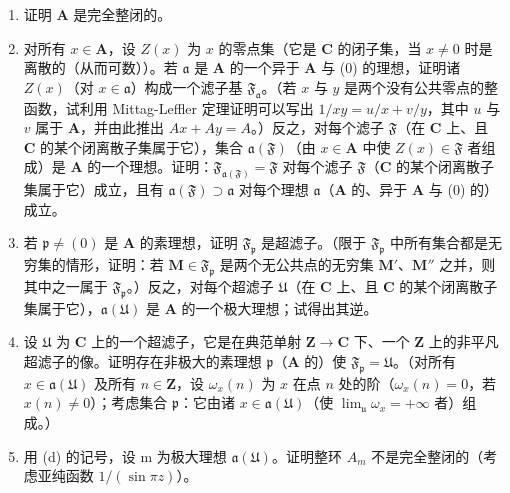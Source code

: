 \begin{enumerate}
\def\labelenumi{(\alph{enumi})}
\item
  证明 \(\mathbf{A}\) 是完全整闭的。
\item
  对所有 \(x \in \mathbf{A}\)，设 \(Z(x)\) 为 \(x\) 的零点集（它是 \(\mathbf{C}\) 的闭子集，当 \(x \neq 0\) 时是离散的（从而可数））。若 \(\mathfrak{a}\) 是 \(\mathbf{A}\) 的一个异于 \(\mathbf{A}\) 与 (0) 的理想，证明诸 \(Z(x)\)（对 \(x \in \mathfrak{a}\)）构成一个滤子基 \(\mathfrak{F}_{\mathfrak{a}}\)。（若 \(x\) 与 \(y\) 是两个没有公共零点的整函数，试利用 Mittag-Leffler 定理证明可以写出 \(1 / xy = u / x + v / y\)，其中 \(u\) 与 \(v\) 属于 \(\mathbf{A}\)，并由此推出 \(Ax + Ay = A\)。）反之，对每个滤子 \(\mathfrak{F}\)（在 \(\mathbf{C}\) 上、且 \(\mathbf{C}\) 的某个闭离散子集属于它），集合 \(\mathfrak{a}(\mathfrak{F})\)（由 \(x \in \mathbf{A}\) 中使 \(Z(x) \in \mathfrak{F}\) 者组成）是 \(\mathbf{A}\) 的一个理想。证明：\(\mathfrak{F}_{\mathfrak{a}(\mathfrak{F})} = \mathfrak{F}\) 对每个滤子 \(\mathfrak{F}\)（\(\mathbf{C}\) 的某个闭离散子集属于它）成立，且有 \(\mathfrak{a}(\mathfrak{F}) \supset \mathfrak{a}\) 对每个理想 \(\mathfrak{a}\)（\(\mathbf{A}\) 的、异于 \(\mathbf{A}\) 与 (0) 的）成立。
\item
  若 \(\mathfrak{p} \neq (0)\) 是 \(\mathbf{A}\) 的素理想，证明 \(\mathfrak{F}_{\mathfrak{p}}\) 是超滤子。（限于 \(\mathfrak{F}_{\mathfrak{p}}\) 中所有集合都是无穷集的情形，证明：若 \(\mathbf{M} \in \mathfrak{F}_{\mathfrak{p}}\) 是两个无公共点的无穷集 \(\mathbf{M}'\)、\(\mathbf{M}''\) 之并，则其中之一属于 \(\mathfrak{F}_{\mathfrak{p}}\)。）反之，对每个超滤子 \(\mathfrak{U}\)（在 \(\mathbf{C}\) 上、且 \(\mathbf{C}\) 的某个闭离散子集属于它），\(\mathfrak{a}(\mathfrak{U})\) 是 \(\mathbf{A}\) 的一个极大理想；试得出其逆。
\item
  设 \(\mathfrak{U}\) 为 \(\mathbf{C}\) 上的一个超滤子，它是在典范单射 \(\mathbf{Z} \to \mathbf{C}\) 下、一个 \(\mathbf{Z}\) 上的非平凡超滤子的像。证明存在非极大的素理想 \(\mathfrak{p}\)（\(\mathbf{A}\) 的）使 \(\mathfrak{F}_{\mathfrak{p}} = \mathfrak{U}\)。（对所有 \(x \in \mathfrak{a}(\mathfrak{U})\) 及所有 \(n \in \mathbf{Z}\)，设 \(\omega_x(n)\) 为 \(x\) 在点 \(n\) 处的阶（\(\omega_x(n) = 0\)，若 \(x(n) \neq 0\)）；考虑集合 \(\mathfrak{p}\)：它由诸 \(x \in \mathfrak{a}(\mathfrak{U})\)（使 \(\lim_{\mathfrak{u}} \omega_x = +\infty\) 者）组成。）
\item
  用 (d) 的记号，设 m 为极大理想 \(\mathfrak{a}(\mathfrak{U})\)。证明整环 \(A_{m}\) 不是完全整闭的（考虑亚纯函数 \(1/(\sin\pi z)\)）。
\end{enumerate}

